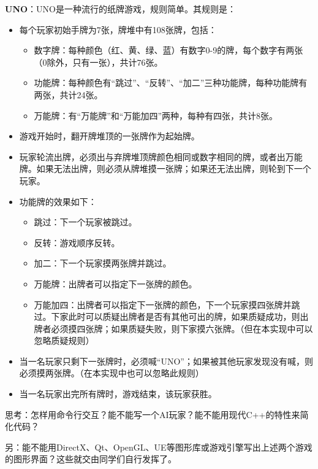 \textbf{UNO}：UNO是一种流行的纸牌游戏，规则简单。其规则是：
\begin{itemize}
    \item 每个玩家初始手牌为7张，牌堆中有108张牌，包括：
    \begin{itemize}
        \item 数字牌：每种颜色（红、黄、绿、蓝）有数字0-9的牌，每个数字有两张（0除外，只有一张），共计76张。
        \item 功能牌：每种颜色有“跳过”、“反转”、“加二”三种功能牌，每种功能牌有两张，共计24张。
        \item 万能牌：有“万能牌”和“万能加四”两种，每种有四张，共计8张。
    \end{itemize}
    \item 游戏开始时，翻开牌堆顶的一张牌作为起始牌。
    \item 玩家轮流出牌，必须出与弃牌堆顶牌颜色相同或数字相同的牌，或者出万能牌。如果无法出牌，则必须从牌堆摸一张牌；如果还无法出牌，则轮到下一个玩家。
    \item 功能牌的效果如下：
    \begin{itemize}
        \item 跳过：下一个玩家被跳过。
        \item 反转：游戏顺序反转。
        \item 加二：下一个玩家摸两张牌并跳过。
        \item 万能牌：出牌者可以指定下一张牌的颜色。
        \item 万能加四：出牌者可以指定下一张牌的颜色，下一个玩家摸四张牌并跳过。下家此时可以质疑出牌者是否有其他可出的牌，如果质疑成功，则出牌者必须摸四张牌；如果质疑失败，则下家摸六张牌。（但在本实现中可以忽略质疑规则）
    \end{itemize}
    \item 当一名玩家只剩下一张牌时，必须喊“UNO”；如果被其他玩家发现没有喊，则必须摸两张牌。（在本实现中也可以忽略此规则）
    \item 当一名玩家出完所有牌时，游戏结束，该玩家获胜。
\end{itemize}

思考：怎样用命令行交互？能不能写一个AI玩家？能不能用现代C++的特性来简化代码？

另：能不能用DirectX、Qt、OpenGL、UE等图形库或游戏引擎写出上述两个游戏的图形界面？这些就交由同学们自行发挥了。